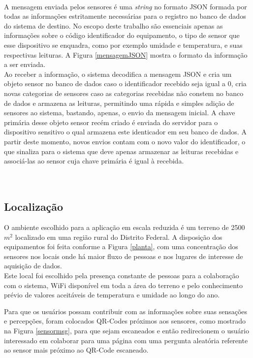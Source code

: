 \\\null \quad A mensagem enviada pelos sensores é uma \textit{string} no formato JSON formada por todas as informações estritamente necessárias para o registro no banco de dados do sistema de destino.
No escopo deste trabalho são essenciais apenas as informações sobre o código identificador do equipamento, o tipo de sensor que esse dispositivo se enquadra, como por exemplo umidade e temperatura, e suas respectivas leituras. A Figura \ref{mensagemJSON} mostra o formato da informação a ser enviada.
\\\null \quad Ao receber a informação, o sistema decodifica a mensagem JSON e cria um objeto sensor no banco de dados caso o identificador recebido seja igual a 0, cria novas categorias de sensores caso as categorias recebidas não constem no banco de dados e armazena as leituras, permitindo uma rápida e simples adição de sensores ao sistema, bastando, apenas, o envio da mensagem inicial. A chave primária desse objeto sensor recém criado é enviada do servidor para o dispositivo sensitivo o qual armazena este identicador em seu banco de dados. A partir deste momento, novos envios contam com o novo valor do identificador, o que sinaliza para o sistema que deve apenas armazenar as leituras recebidas e associá-las ao sensor cuja chave primária é igual à recebida.
\\\\\\

\subsection{Localização}
\quad O ambiente escolhido para a aplicação em escala reduzida é um terreno de 2500 $m^2$ localizado em uma
região rural do Distrito Federal. A disposição dos equipamentos foi feita conforme a Figura \ref{planta},
com uma concentração dos sensores nos locais onde há maior fluxo de pessoas e nos lugares de interesse de
aquisição de dados.
\\\null \quad Este local foi escolhido pela presença constante de pessoas para a colaboração com o sistema, WiFi disponível em toda a área do terreno e pelo conhecimento prévio de valores aceitáveis de temperatura
  e umidade ao longo do ano.
\newpage

\newpage
Para que os usuários possam contribuir com as informações sobre suas sensações e percepções, foram colocados QR-Codes próximos aos sensores, como mostrado na Figura \ref{sensormsg}, para que sejam escaneados e então redirecionem o usuário interessado em colaborar para uma página com uma pergunta aleatória referente ao sensor mais próximo ao QR-Code escaneado.

